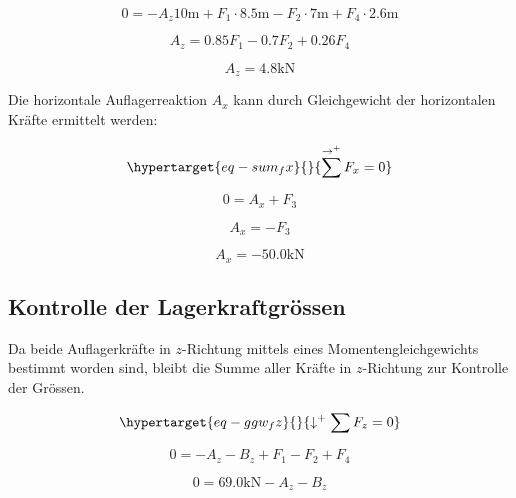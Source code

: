 \documentclass[
  12pt,
  letterpaper,
  DIV=11,
  egregdoesnotlikesansseriftitles]{scrartcl}
\begin{document}
\begin{equation}0 = - A_{z} 10 \text{m} + F_{1} \cdot 8.5 \text{m} - F_{2} \cdot 7 \text{m} + F_{4} \cdot 2.6 \text{m}\end{equation}

\begin{equation}A_{z} = 0.85 F_{1} - 0.7 F_{2} + 0.26 F_{4}\end{equation}

\begin{equation}A_{z} = 4.8 \text{k} \text{N}\end{equation}

Die horizontale Auflagerreaktion \(A_x\) kann durch Gleichgewicht der
horizontalen Kräfte ermittelt werden:

\begin{equation}\protect\hypertarget{eq-sum_fx}{}{
\sum^{\rightarrow^+} F_x = 0
}\label{eq-sum_fx}\end{equation}

\begin{equation}0 = A_{x} + F_{3}\end{equation}

\begin{equation}A_{x} = - F_{3}\end{equation}

\begin{equation}A_{x} = - 50.0 \text{k} \text{N}\end{equation}

\hypertarget{kontrolle-der-lagerkraftgruxf6ssen}{%
\subsection{Kontrolle der
Lagerkraftgrössen}\label{kontrolle-der-lagerkraftgruxf6ssen}}

Da beide Auflagerkräfte in \(z\)-Richtung mittels eines
Momentengleichgewichts bestimmt worden sind, bleibt die Summe aller
Kräfte in \(z\)-Richtung zur Kontrolle der Grössen.

\begin{equation}\protect\hypertarget{eq-ggw_fz}{}{
\downarrow^+\sum F_z = 0
}\label{eq-ggw_fz}\end{equation}

\begin{equation}0 = - A_{z} - B_{z} + F_{1} - F_{2} + F_{4}\end{equation}

\begin{equation}0 = 69.0 \text{k} \text{N} - A_{z} - B_{z}\end{equation}
\end{document}
